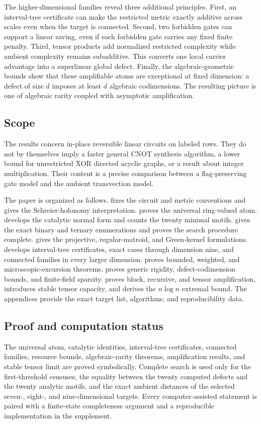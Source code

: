 The higher-dimensional families reveal three additional principles.  First, an interval-tree certificate can make the restricted metric exactly additive across scales even when the target is connected.  Second, two forbidden gates can support a linear saving, even if each forbidden gate carries any fixed finite penalty.  Third, tensor products add normalized restricted complexity while ambient complexity remains subadditive.  This converts one local carrier advantage into a superlinear global defect.  Finally, the algebraic-geometric bounds show that these amplifiable atoms are exceptional at fixed dimension: a defect of size $d$ imposes at least $d$ algebraic codimensions.  The resulting picture is one of algebraic rarity coupled with asymptotic amplification.

\subsection*{Scope}

The results concern in-place reversible linear circuits on labeled rows.  They do not by themselves imply a faster general CNOT synthesis algorithm, a lower bound for unrestricted XOR directed acyclic graphs, or a result about integer multiplication.  Their content is a precise comparison between a flag-preserving gate model and the ambient transvection model.

The paper is organized as follows.   fixes the circuit and metric conventions and gives the Schreier-holonomy interpretation.   proves the universal ring-valued atom.   develops the catalytic normal form and counts the twenty minimal motifs.   gives the exact binary and ternary enumerations and proves the search procedure complete.   gives the projective, regular-matroid, and Green-kernel formulations.   develops interval-tree certificates, exact cases through dimension nine, and connected families in every larger dimension.   proves bounded, weighted, and microscopic-excursion theorems.   proves generic rigidity, defect-codimension bounds, and finite-field sparsity.   proves block, recursive, and tensor amplification, introduces stable tensor capacity, and derives the $n\log n$ extremal bound.  The appendices provide the exact target list, algorithms, and reproducibility data.

\subsection*{Proof and computation status}
The universal atom, catalytic identities, interval-tree certificates, connected families, resource bounds, algebraic-rarity theorems, amplification results, and stable tensor limit are proved symbolically.  Complete search is used only for the first-threshold censuses, the equality between the twenty computed defects and the twenty analytic motifs, and the exact ambient distances of the selected seven-, eight-, and nine-dimensional targets.  Every computer-assisted statement is paired with a finite-state completeness argument and a reproducible implementation in the supplement.

